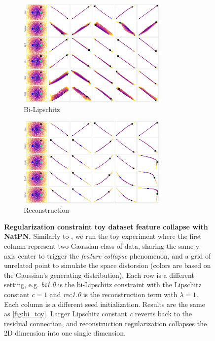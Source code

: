 \begin{figure}[!htb]
    \label{fig:toy}
\end{figure}

\begin{figure}[!htb]
    \begin{subfigure}[b]{\textwidth}
        \centering
        \includegraphics[width=0.8\textwidth]{sections/008_iclr2023/figures/toy/blob2/bi_collapse.png}
        \caption{Bi-Lipschitz}
        \label{fig:bi_toy_collapse}
    \end{subfigure}
    \begin{subfigure}[b]{\textwidth}
        \centering
        \includegraphics[width=0.8\textwidth]{sections/008_iclr2023/figures/toy/blob2/rec_collapse.png}
        \caption{Reconstruction}
        \label{fig:rec_toy_collapse}
    \end{subfigure}
    \caption{\textbf{Regularization constraint toy dataset feature collapse with NatPN.} Similarly to \citep{due}, we run the toy experiment where the first column represent two Gaussian class of data, sharing the same y-axis center to trigger the \textit{feature collapse} phenomenon, and a grid of unrelated point to simulate the space distorsion (colors are based on the Gaussian's generating distribution). 
    Each row is a different setting, e.g. \textit{bi1.0} is the bi-Lipschitz constraint with the Lipschitz constant $c = 1$ and \textit{rec1.0} is the reconstruction term with $\lambda=1$. Each column is a different seed initialization. Results are the same as \ref{fig:bi_toy}. Larger Lipschitz constant \textit{c} reverts back to the residual connection, and reconstruction regularization collapses the 2D dimension into one single dimension. }
    \label{fig:toy_collpase}
\end{figure}


